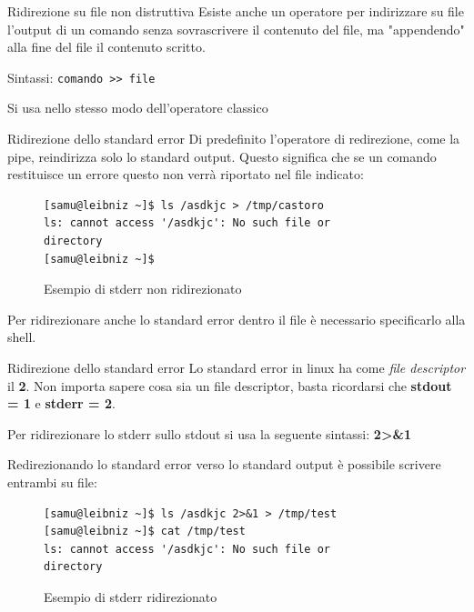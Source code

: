 \documentclass{beamer}
\begin{document}
\begin{frame}{Ridirezione su file non distruttiva}
  Esiste anche un operatore per indirizzare su file l'output di un comando senza 
  sovrascrivere il contenuto del file, ma "appendendo" alla fine del file il
  contenuto scritto.\bigskip

  Sintassi: \texttt{comando >> file}\bigskip

  Si usa nello stesso modo dell'operatore classico\bigskip
\end{frame}

\begin{frame}[fragile]{Ridirezione dello standard error}
  Di predefinito l'operatore di redirezione, come la pipe, reindirizza solo
  lo standard output. Questo significa che se un comando restituisce un errore
  questo non verrà riportato nel file indicato:

  \begin{figure}
    \begin{lstlisting}
[samu@leibniz ~]$ ls /asdkjc > /tmp/castoro
ls: cannot access '/asdkjc': No such file or 
directory
[samu@leibniz ~]$
    \end{lstlisting}
    \caption{Esempio di stderr non ridirezionato}
  \end{figure}

  Per ridirezionare anche lo standard error dentro il file è necessario
  specificarlo alla shell.
\end{frame}

\begin{frame}[fragile]{Ridirezione dello standard error}
  Lo standard error in linux ha come \textit{file descriptor} il \textbf{2}. 
  Non importa sapere cosa sia un file descriptor, basta ricordarsi che
  \textbf{stdout = 1} e \textbf{stderr = 2}. \medskip

  Per ridirezionare lo stderr sullo stdout si usa la seguente sintassi:
  \textbf{2>\&1} \medskip

  Redirezionando lo standard error verso lo standard output è possibile scrivere
  entrambi su file:
  \begin{figure}
    \begin{lstlisting}
[samu@leibniz ~]$ ls /asdkjc 2>&1 > /tmp/test
[samu@leibniz ~]$ cat /tmp/test
ls: cannot access '/asdkjc': No such file or 
directory
    \end{lstlisting}
    \caption{Esempio di stderr ridirezionato}
  \end{figure}
\end{frame}
\end{document}
